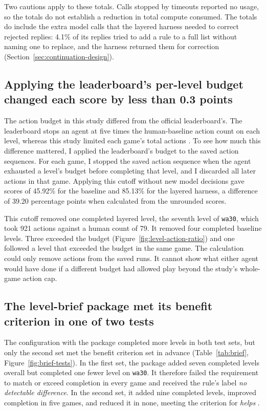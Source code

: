 Two cautions apply to these totals. Calls stopped by timeouts reported no usage, so the totals do not establish a reduction in total compute consumed. The totals do include the extra model calls that the layered harness needed to correct rejected replies: 4.1\% of its replies tried to add a rule to a full list without naming one to replace, and the harness returned them for correction (Section~\ref{sec:continuation-design}).

\subsection{Applying the leaderboard's per-level budget changed each score by less than 0.3 points}\label{sec:result-budget}
The action budget in this study differed from the official leaderboard's. The leaderboard stops an agent at five times the human-baseline action count on each level, whereas this study limited each game's total actions \citep{arc2026technical}. To see how much this difference mattered, I applied the leaderboard's budget to the saved action sequences. For each game, I stopped the saved action sequence when the agent exhausted a level's budget before completing that level, and I discarded all later actions in that game. Applying this cutoff without new model decisions gave scores of 45.92\% for the baseline and 85.13\% for the layered harness, a difference of 39.20 percentage points when calculated from the unrounded scores.

This cutoff removed one completed layered level, the seventh level of \texttt{wa30}, which took 921 actions against a human count of 79. It removed four completed baseline levels. Three exceeded the budget (Figure~\ref{fig:level-action-ratio}) and one followed a level that exceeded the budget in the same game. The calculation could only remove actions from the saved runs. It cannot show what either agent would have done if a different budget had allowed play beyond the study's whole-game action cap.

\subsection{The level-brief package met its benefit criterion in one of two tests}\label{sec:result-brief}
The configuration with the package completed more levels in both test sets, but only the second set met the benefit criterion set in advance (Table~\ref{tab:brief}, Figure~\ref{fig:brief-tests}). In the first set, the package added seven completed levels overall but completed one fewer level on \texttt{wa30}. It therefore failed the requirement to match or exceed completion in every game and received the rule's label \emph{no detectable difference}. In the second set, it added nine completed levels, improved completion in five games, and reduced it in none, meeting the criterion for \emph{helps} \citep{dai2026brieftests}.

